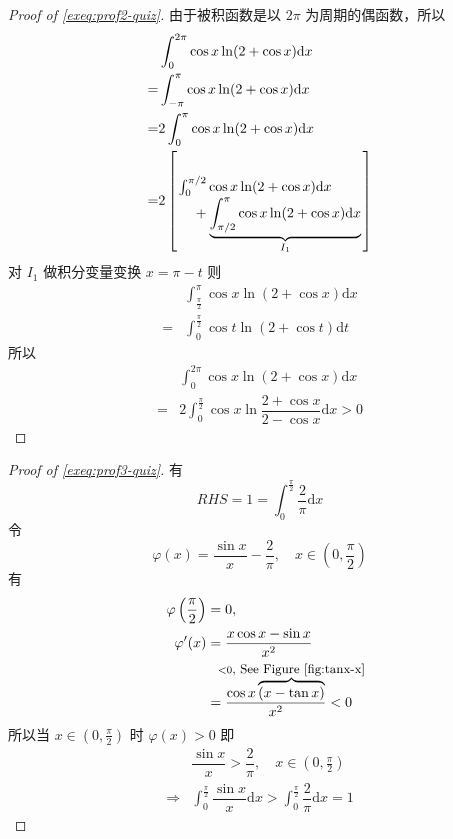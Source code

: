 \begin{example}
    \begin{proof}[Proof of \ref{exeq:prof2-quiz}]
        由于被积函数是以 $2\pi$ 为周期的偶函数，所以
        \begin{align*}
            &\int_0^{2\pi} \cos x \ln ( 2+ \cos x ) \mathrm dx \\
            =&\int_{-\pi}^{\pi} \cos x \ln ( 2+ \cos x ) \mathrm dx \\
            =&2\int_{0}^{\pi} \cos x \ln ( 2+ \cos x ) \mathrm dx \\
            =&2\left[
                \splitfrac{
                    \int_0^{\pi/2} \cos x \ln ( 2+ \cos x ) \mathrm dx
                }{
                    + 
                    \underbrace{\int_{\pi/2}^{\pi} \cos x \ln ( 2+ \cos x ) \mathrm dx}_{I_1}
                }
            \right]
        \end{align*}
        对 $I_1$ 做积分变量变换 $x = \pi - t$ 则
        \begin{align*}
            &\int_{\frac{\pi}{2}}^{\pi} \cos x \ln ( 2+ \cos x ) \mathrm dx \\
            =&\int_0^{\frac{\pi}{2}} \cos t \ln ( 2+ \cos t ) \mathrm dt 
        \end{align*}
        所以
        \begin{align*}
            &\int_0^{2\pi } \cos x \ln (2 + \cos x) \mathrm dx \\
            =&2 \int_0^{\frac{\pi}{2}} \cos x \ln \dfrac{2+ \cos x}{2- \cos x} \mathrm dx > 0
        \end{align*}
    \end{proof}

    \begin{proof}[Proof of \ref{exeq:prof3-quiz}]
        有
        \[
            RHS = 1 = \int_0^{\frac{\pi}{2}} \dfrac{2}{\pi} \mathrm dx
        \]
        令
        \[
            \varphi(x) = \frac{\sin x}{x} -\frac{2}{\pi}, \quad x \in \left(0, \frac{\pi}{2}\right)
        \]
        有
        \begin{align*}
            \varphi\left(\frac{\pi}{2}\right) &= 0, \\
            \varphi'(x) &= \dfrac{x \cos x - \sin x}{x^2}\\
                        &= \dfrac{\cos x \overbrace{(x - \tan x)}^{\mathclap{<0 \mbox{\small, See Figure \ref{fig:tanx-x}}}}}{x^2} < 0
        \end{align*}
        所以当 $x \in \left(0, \frac{\pi}{2}\right)$ 时 $\varphi(x)>0$
        即
        \begin{align*}
            &\dfrac{\sin x}{x} > \dfrac{2}{\pi}, \quad x \in \left(0, \frac{\pi}{2}\right) \\
            \Rightarrow &\int_0^{\frac{\pi}{2}} \dfrac{\sin x}{x} \mathrm dx > \int_0^{\frac{\pi}{2}} \dfrac{2}{\pi} \mathrm dx = 1
        \end{align*}
    \end{proof}
\end{example}

